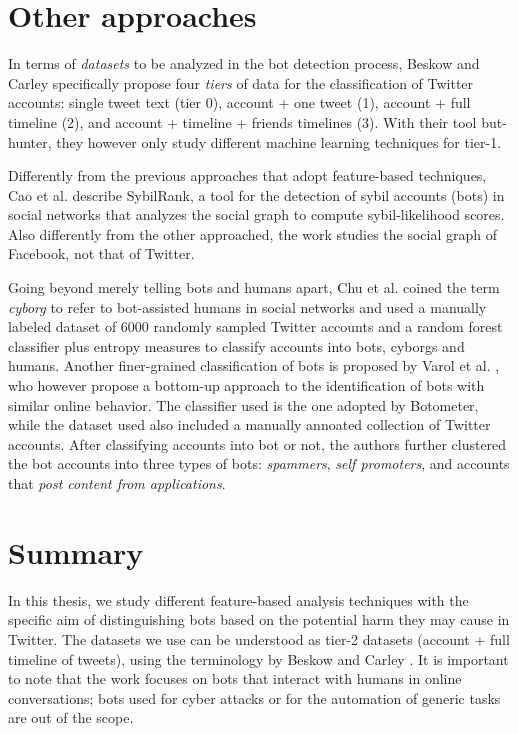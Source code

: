 \section{Other approaches}
In terms of \emph{datasets} to be analyzed in the bot detection process, Beskow and Carley \cite{Beskow2018} specifically propose four \emph{tiers} of data for the classification of Twitter accounts: single tweet text (tier 0), account + one tweet (1), account + full timeline (2), and account + timeline + friends timelines (3). With their tool but-hunter, they however only study different machine learning techniques for tier-1.

Differently from the previous approaches that adopt feature-based techniques, Cao et al. \cite{cao2012aiding} describe SybilRank, a tool for the detection of sybil accounts (bots) in social networks that analyzes the social graph to compute sybil-likelihood scores. Also differently from the other approached, the work studies the social graph of Facebook, not that of Twitter.

Going beyond merely telling bots and humans apart, Chu et al. \cite{chu2012detecting} coined the term \emph{cyborg} to refer to bot-assisted humans in  social networks and used a manually labeled dataset of 6000 randomly sampled Twitter accounts and a random forest classifier plus entropy measures to classify accounts into bots, cyborgs and humans. Another finer-grained classification of bots is proposed by Varol et al. \cite{varol2017online}, who however propose a bottom-up approach to the identification of bots with similar online behavior. The classifier used is the one adopted by Botometer, while the dataset used also included a manually annoated collection of Twitter accounts. After classifying accounts into bot or not, the authors further clustered the bot accounts into three types of bots: \emph{spammers}, \textit{self promoters}, and accounts that \textit{post content from applications}.


\section{Summary}
In this thesis, we study different feature-based analysis techniques with the specific aim of distinguishing bots based on the potential harm they may cause in Twitter. The datasets we use can be understood as tier-2 datasets (account + full timeline of tweets), using the terminology by Beskow and Carley \cite{Beskow2018}. It is important to note that the work focuses on bots that interact with humans in online conversations; bots used for cyber attacks or for the automation of generic tasks are out of the scope.
